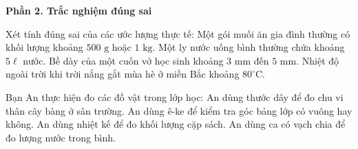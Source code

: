 \textbf{Phần 2. Trắc nghiệm đúng sai}

\begin{ex} %
Xét tính đúng sai của các ước lượng thực tế:
\choiceTF
{\True Một gói muối ăn gia đình thường có khối lượng khoảng $500\text{ g}$ hoặc $1\text{ kg}$.}
{Một ly nước uống bình thường chứa khoảng $5\ell$ nước.}
{\True Bề dày của một cuốn vở học sinh khoảng $3\text{ mm}$ đến $5\text{ mm}$.}
{Nhiệt độ ngoài trời khi trời nắng gắt mùa hè ở miền Bắc khoảng $80^\circ\text{C}$.}
\end{ex}

\begin{ex} %
Bạn An thực hiện đo các đồ vật trong lớp học:
\choiceTF
{\True An dùng thước dây để đo chu vi thân cây bàng ở sân trường.}
{\True An dùng ê-ke để kiểm tra góc bảng lớp có vuông hay không.}
{An dùng nhiệt kế để đo khối lượng cặp sách.}
{\True An dùng ca có vạch chia để đo lượng nước trong bình.}
\end{ex}

